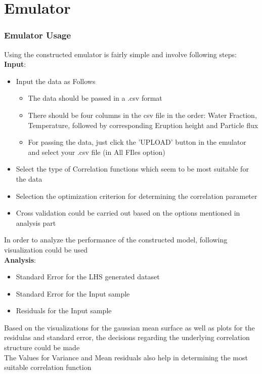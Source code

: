 \documentclass[10pt]{beamer}
\begin{document}
\section{Emulator}
\begin{frame}
\frametitle{Emulator Usage}
Using the constructed emulator is fairly simple and involve following steps:\\

{\bf Input}:
\begin{itemize}
    \item Input the data as Follows
    \begin{itemize}
        \item The data should be passed in a .csv format
        \item There should be four columns in the csv file in the order: Water Fraction, Temperature, followed by corresponding Eruption height and Particle flux
        \item For passing the data, just click the 'UPLOAD' button in the emulator and select your .csv file (in All FIles option)
   \end{itemize}
    \item Select the type of Correlation functions which seem to be most suitable for the data
    \item Selection the optimization criterion for determining the correlation parameter
    \item Cross validation could be carried out based on the options mentioned in analysis part
\end{itemize}

\end{frame}
\begin{frame}
In order to analyze the performance of the constructed model, following visualization could be used \\
\vspace{4mm}
{\bf Analysis}:
\begin{itemize}
    \item Standard Error for the LHS generated dataset
    \item Standard Error for the Input sample
    \item Residuals for the Input sample
\end{itemize}
\vspace{4mm}
Based on the visualizations for the gaussian mean surface as well as plots for the residulas and standard error, the decisions regarding the underlying correlation structure could be made\\
\vspace{2mm}
The Values for Variance and Mean residuals also help in determining the most suitable correlation function 
\end{frame}
\end{document}
